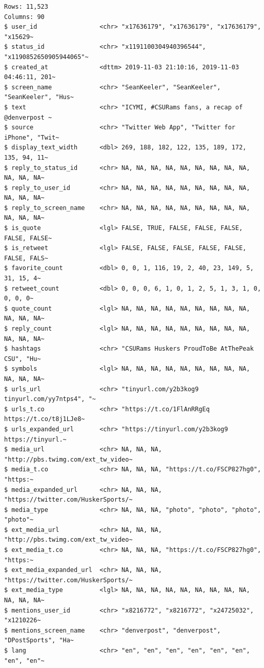 \documentclass[
  letterpaper,
  DIV=11,
  numbers=noendperiod]{scrreprt}
\begin{document}
\begin{verbatim}
Rows: 11,523
Columns: 90
$ user_id                 <chr> "x17636179", "x17636179", "x17636179", "x15629~
$ status_id               <chr> "x1191100304940396544", "x1190852650905944065"~
$ created_at              <dttm> 2019-11-03 21:10:16, 2019-11-03 04:46:11, 201~
$ screen_name             <chr> "SeanKeeler", "SeanKeeler", "SeanKeeler", "Hus~
$ text                    <chr> "ICYMI, #CSURams fans, a recap of @denverpost ~
$ source                  <chr> "Twitter Web App", "Twitter for iPhone", "Twit~
$ display_text_width      <dbl> 269, 188, 182, 122, 135, 189, 172, 135, 94, 11~
$ reply_to_status_id      <chr> NA, NA, NA, NA, NA, NA, NA, NA, NA, NA, NA, NA~
$ reply_to_user_id        <chr> NA, NA, NA, NA, NA, NA, NA, NA, NA, NA, NA, NA~
$ reply_to_screen_name    <chr> NA, NA, NA, NA, NA, NA, NA, NA, NA, NA, NA, NA~
$ is_quote                <lgl> FALSE, TRUE, FALSE, FALSE, FALSE, FALSE, FALSE~
$ is_retweet              <lgl> FALSE, FALSE, FALSE, FALSE, FALSE, FALSE, FALS~
$ favorite_count          <dbl> 0, 0, 1, 116, 19, 2, 40, 23, 149, 5, 31, 15, 4~
$ retweet_count           <dbl> 0, 0, 0, 6, 1, 0, 1, 2, 5, 1, 3, 1, 0, 0, 0, 0~
$ quote_count             <lgl> NA, NA, NA, NA, NA, NA, NA, NA, NA, NA, NA, NA~
$ reply_count             <lgl> NA, NA, NA, NA, NA, NA, NA, NA, NA, NA, NA, NA~
$ hashtags                <chr> "CSURams Huskers ProudToBe AtThePeak CSU", "Hu~
$ symbols                 <lgl> NA, NA, NA, NA, NA, NA, NA, NA, NA, NA, NA, NA~
$ urls_url                <chr> "tinyurl.com/y2b3kog9 tinyurl.com/yy7ntps4", "~
$ urls_t.co               <chr> "https://t.co/1FlAnRRgEq https://t.co/t8j1LJe8~
$ urls_expanded_url       <chr> "https://tinyurl.com/y2b3kog9 https://tinyurl.~
$ media_url               <chr> NA, NA, NA, "http://pbs.twimg.com/ext_tw_video~
$ media_t.co              <chr> NA, NA, NA, "https://t.co/FSCP827hg0", "https:~
$ media_expanded_url      <chr> NA, NA, NA, "https://twitter.com/HuskerSports/~
$ media_type              <chr> NA, NA, NA, "photo", "photo", "photo", "photo"~
$ ext_media_url           <chr> NA, NA, NA, "http://pbs.twimg.com/ext_tw_video~
$ ext_media_t.co          <chr> NA, NA, NA, "https://t.co/FSCP827hg0", "https:~
$ ext_media_expanded_url  <chr> NA, NA, NA, "https://twitter.com/HuskerSports/~
$ ext_media_type          <lgl> NA, NA, NA, NA, NA, NA, NA, NA, NA, NA, NA, NA~
$ mentions_user_id        <chr> "x8216772", "x8216772", "x24725032", "x1210226~
$ mentions_screen_name    <chr> "denverpost", "denverpost", "DPostSports", "Ha~
$ lang                    <chr> "en", "en", "en", "en", "en", "en", "en", "en"~

\end{verbatim}
\end{document}

